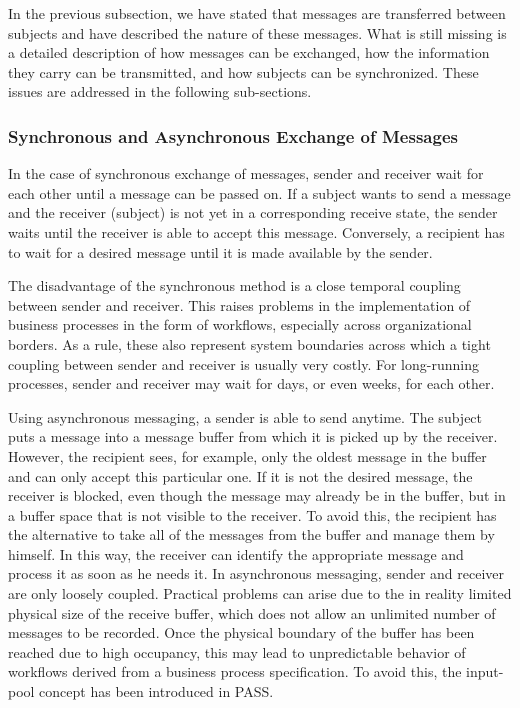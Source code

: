 In the previous subsection, we have stated that messages are transferred between subjects and have described the nature of these messages. What is still missing is a detailed description of how messages can be exchanged, how the information they carry can be transmitted, and how subjects can be synchronized. These issues are addressed in the following sub-sections.

\subsubsection{Synchronous and Asynchronous Exchange of Messages}
In the case of synchronous exchange of messages, sender and receiver wait for each other until a message can be passed on. If a subject wants to send a message and the receiver (subject) is not yet in a corresponding receive state, the sender waits until the receiver is able to accept this message. Conversely, a recipient has to wait for a desired message until it is made available by the sender.\

The disadvantage of the synchronous method is a close temporal coupling between sender and receiver. This raises problems in the implementation of business processes in the form of workflows, especially across organizational borders. As a rule, these also represent system boundaries across which a tight coupling between sender and receiver is usually very costly. For long-running processes, sender and receiver may wait for days, or even weeks, for each other.\

Using asynchronous messaging, a sender is able to send anytime. The subject puts a message into a message buffer from which it is picked up by the receiver. However, the recipient sees, for example, only the oldest message in the buffer and can only accept this particular one. If it is not the desired message, the receiver is blocked, even though the message may already be in the buffer, but in a buffer space that is not visible to the receiver. To avoid this, the recipient has the alternative to take all of the messages from the buffer and manage them by himself. In this way, the receiver can identify the appropriate message and process it as soon as he needs it. In asynchronous messaging, sender and receiver are only loosely coupled. Practical problems can arise due to the in reality limited physical size of the receive buffer, which does not allow an unlimited number of messages to be recorded. Once the physical boundary of the buffer has been reached due to high occupancy, this may lead to unpredictable behavior of workflows derived from a business process specification. To avoid this, the input-pool concept has been introduced in PASS.


